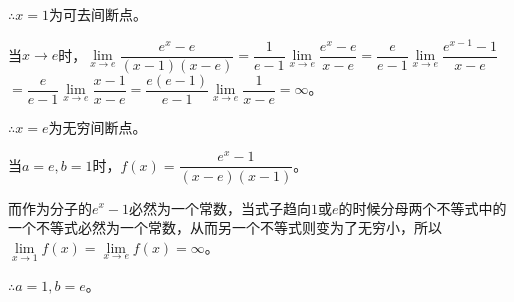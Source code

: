 $\therefore x=1$为可去间断点。\medskip

当$x\to e$时，$\lim\limits_{x\to e}\dfrac{e^x-e}{(x-1)(x-e)}$$=\dfrac{1}{e-1}\lim\limits_{x\to e}\dfrac{e^x-e}{x-e}$$=\dfrac{e}{e-1}\lim\limits_{x\to e}\dfrac{e^{x-1}-1}{x-e}$\medskip$=\dfrac{e}{e-1}\lim\limits_{x\to e}\dfrac{x-1}{x-e}$$=\dfrac{e(e-1)}{e-1}\lim\limits_{x\to e}\dfrac{1}{x-e}=\infty$。\medskip

$\therefore x=e$为无穷间断点。\medskip

当$a=e,b=1$时，$f(x)=\dfrac{e^x-1}{(x-e)(x-1)}$。\medskip

而作为分子的$e^x-1$必然为一个常数，当式子趋向$1$或$e$的时候分母两个不等式中的一个不等式必然为一个常数，从而另一个不等式则变为了无穷小，所以$\lim\limits_{x\to 1}f(x)=\lim\limits_{x\to e}f(x)=\infty$。

$\therefore a=1,b=e$。
